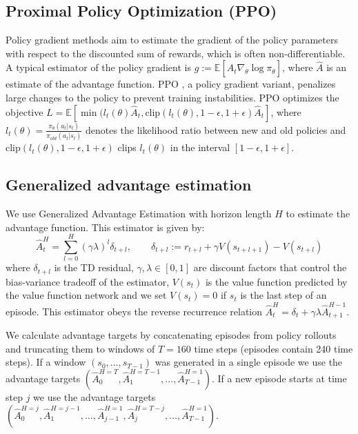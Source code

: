 \subsection{Proximal Policy Optimization (PPO)}
Policy gradient methods aim to estimate the gradient of the policy parameters with respect to the discounted sum of rewards, which is often non-differentiable.
A typical estimator of the policy gradient is $g := \mathbb{E}[\hat{A}_t \nabla_\theta \log \pi_\theta]$, where $\hat{A}$ is an estimate of the advantage function. PPO \citep{schulman2017proximal}, a policy gradient variant, penalizes large changes to the policy to prevent training instabilities. PPO optimizes the objective $L = \mathbb{E}\left[\min(l_t(\theta)\hat{A}_t, \textrm{clip}(l_t(\theta), 1 - \epsilon, 1 + \epsilon)\hat{A}_t\right]$, where $l_t(\theta) = \frac{\pi_\theta(a_t|s_t)}{\pi_{old}(a_t|s_t)}$ denotes the likelihood ratio between new and old policies and $\textrm{clip}(l_t(\theta), 1 - \epsilon, 1 + \epsilon)$ clips $l_t(\theta)$ in the interval $[1-\epsilon, 1+\epsilon]$.

\subsection{Generalized advantage estimation}
We use Generalized Advantage Estimation \citep{schulman2015high} with horizon length $H$ to estimate the advantage function. This estimator is given by:
\begin{equation*}
    \hat{A}_t^H = \sum_{l=0}^H (\gamma \lambda)^l \delta_{t+l}, \qquad \delta_{t+l} :=  r_{t+l} + \gamma V(s_{t+l+1}) - V(s_{t+l}) 
\end{equation*}
where $\delta_{t+l}$ is the TD residual, $\gamma, \lambda \in [0,1]$ are discount factors that control the bias-variance tradeoff of the estimator, $V(s_t)$ is the value function predicted by the value function network and we set $V(s_t) = 0$ if $s_t$ is the last step of an episode. This estimator obeys the reverse recurrence relation $\hat{A}_t^H = \delta_t + \gamma \lambda \hat{A}_{t+1}^{H-1}$.

We calculate advantage targets by concatenating episodes from policy rollouts and truncating them to windows of $T=160$ time steps (episodes contain 240 time steps). If a window $(s_0, \ldots, s_{T-1})$ was generated in a single episode we use the advantage targets $(\hat{A}_0^{H=T}, \hat{A}_1^{H=T-1}, \ldots, \hat{A}_{T-1}^{H=1})$. If a new episode starts at time step $j$ we use the advantage targets $(\hat{A}_0^{H=j}, \hat{A}_1^{H=j-1}, \ldots, \hat{A}_{j-1}^{H=1}, \hat{A}_j^{H=T-j}, \ldots, \hat{A}_{T-1}^{H=1})$.

